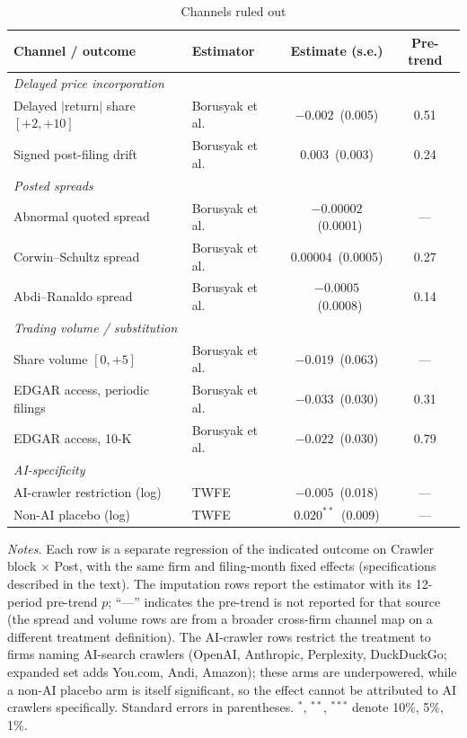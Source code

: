 \begin{table}[t]
\centering
\begin{threeparttable}
\caption{Channels ruled out}
\label{tab:excl}
\footnotesize
\setlength{\tabcolsep}{4pt}
\begin{tabular}{@{}llcc@{}}
\toprule
Channel / outcome & Estimator & Estimate (s.e.) & Pre-trend \\
\midrule
\multicolumn{4}{l}{\textit{Delayed price incorporation}}\\
\quad Delayed $|$return$|$ share $[+2,+10]$ & Borusyak et al.\ & $-0.002$\ (0.005)   & 0.51 \\
\quad Signed post-filing drift              & Borusyak et al.\ & $0.003$\ (0.003)    & 0.24 \\[3pt]
\multicolumn{4}{l}{\textit{Posted spreads}}\\
\quad Abnormal quoted spread                & Borusyak et al.\ & $-0.00002$\ (0.0001)& ---  \\
\quad Corwin--Schultz spread                & Borusyak et al.\ & $0.00004$\ (0.0005) & 0.27 \\
\quad Abdi--Ranaldo spread                  & Borusyak et al.\ & $-0.0005$\ (0.0008) & 0.14 \\[3pt]
\multicolumn{4}{l}{\textit{Trading volume / substitution}}\\
\quad Share volume $[0,+5]$                 & Borusyak et al.\ & $-0.019$\ (0.063)   & ---  \\
\quad EDGAR access, periodic filings        & Borusyak et al.\ & $-0.033$\ (0.030)   & 0.31 \\
\quad EDGAR access, 10-K                    & Borusyak et al.\ & $-0.022$\ (0.030)   & 0.79 \\[3pt]
\multicolumn{4}{l}{\textit{AI-specificity}}\\
\quad AI-crawler restriction (log)          & TWFE & $-0.005$\ (0.018)   & ---  \\
\quad Non-AI placebo (log)                  & TWFE & $0.020^{**}$\ (0.009)& ---  \\
\bottomrule
\end{tabular}
\begin{tablenotes}\footnotesize
\item \textit{Notes.} Each row is a separate regression of the indicated outcome on Crawler block $\times$ Post, with the same firm and filing-month fixed effects (specifications described in the text). The imputation rows report the \citet{BorusyakJaravelSpiess2024} estimator with its 12-period pre-trend $p$; ``---'' indicates the pre-trend is not reported for that source (the spread and volume rows are from a broader cross-firm channel map on a different treatment definition). The AI-crawler rows restrict the treatment to firms naming AI-search crawlers (OpenAI, Anthropic, Perplexity, DuckDuckGo; expanded set adds You.com, Andi, Amazon); these arms are underpowered, while a non-AI placebo arm is itself significant, so the effect cannot be attributed to AI crawlers specifically. Standard errors in parentheses. $^{*}$, $^{**}$, $^{***}$ denote 10\%, 5\%, 1\%.
\end{tablenotes}
\end{threeparttable}
\end{table}
